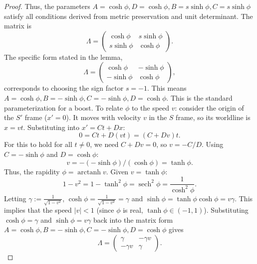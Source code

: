 \documentclass{amsart}
\theoremstyle{definition}
\theoremstyle{remark}
\DeclareMathOperator{\arctanh}{arctanh}
\DeclareMathOperator{\sech}{sech}
\begin{document}
\begin{proof}
  Thus, the parameters $A=\cosh\phi, D=\cosh\phi, B=s\sinh\phi, C=s\sinh\phi$ satisfy all conditions derived from metric preservation and unit determinant.
  The matrix is
  \begin{equation*}
    \Lambda =
    \begin{pmatrix}
      \cosh\phi & s\sinh\phi \\
      s\sinh\phi & \cosh\phi
    \end{pmatrix}.
  \end{equation*}
  The specific form stated in the lemma,
  \begin{equation*}
    \Lambda =
    \begin{pmatrix}
      \cosh\phi & -\sinh\phi \\
      -\sinh\phi & \cosh\phi
    \end{pmatrix},
  \end{equation*}
  corresponds to choosing the sign factor $s=-1$.
  This means $A = \cosh\phi, B = -\sinh\phi, C = -\sinh\phi, D = \cosh\phi$.
  This is the standard parameterization for a boost.
  To relate $\phi$ to the speed $v$: consider the origin of the $S'$ frame ($x'=0$).
  It moves with velocity $v$ in the $S$ frame, so its worldline is $x=vt$.
  Substituting into $x' = C t + D x$:
  \begin{equation*}
    0 = C t + D (vt) = (C + Dv)t.
  \end{equation*}
  For this to hold for all $t \neq 0$, we need $C+Dv=0$, so $v = -C/D$.
  Using $C = -\sinh\phi$ and $D = \cosh\phi$:
  \begin{equation*}
    v = -(-\sinh\phi) / (\cosh\phi) = \tanh\phi.
  \end{equation*}
  Thus, the rapidity $\phi = \arctanh v$.
  Given $v = \tanh\phi$:
  \begin{equation*}
    1 - v^2 = 1 - \tanh^2\phi = \sech^2\phi = \frac{1}{\cosh^2\phi}.
  \end{equation*}
  Letting $\gamma:=\frac{1}{\sqrt{1-v^2}}$, $\cosh\phi = \frac{1}{\sqrt{1-v^2}}=\gamma$ and $\sinh\phi = \tanh\phi \cosh\phi = v\gamma$.
  This implies that the speed $|v| < 1$ (since $\phi$ is real, $\tanh\phi \in (-1,1)$).
  Substituting $\cosh\phi = \gamma$ and $\sinh\phi = v\gamma$ back into the matrix form $A=\cosh\phi, B=-\sinh\phi, C=-\sinh\phi, D=\cosh\phi$ gives
  \begin{equation*}
    \Lambda =
    \begin{pmatrix}
      \gamma & -\gamma v \\
      -\gamma v & \gamma
    \end{pmatrix}.
  \end{equation*}
\end{proof}
\end{document}
